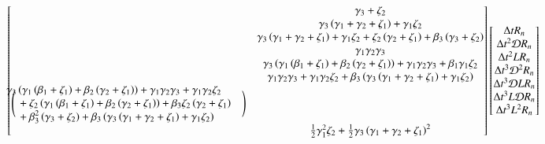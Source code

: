\documentclass[letterpaper,11pt]{amsart}
\begin{document}
\begin{align}
{\begin{bmatrix}
  &\gamma_{3} + \zeta_{2} \\
  &\gamma_{3} \left( \gamma_{1} + \gamma_{2} + \zeta_{1} \right)
  + \gamma_{1} \zeta_{2} \\
  &\gamma_{3} \left( \gamma_{1} + \gamma_{2} + \zeta_{1} \right)
  + \gamma_{1} \zeta_{2}
  + \zeta_{2} \left( \gamma_{2} + \zeta_{1} \right)
  + \beta_{3} \left( \gamma_{3} + \zeta_{2} \right) \\
  &\gamma_{1} \gamma_{2} \gamma_{3} \\
  &\gamma_{3} \left(
      \gamma_{1} \left(  \beta_{1} + \zeta_{1} \right)
      + \beta_{2} \left( \gamma_{2} + \zeta_{1} \right)
    \right)
  + \gamma_{1} \gamma_{2} \gamma_{3}
  + \beta_{1} \gamma_{1} \zeta_{2} \\
  &\gamma_{1} \gamma_{2} \gamma_{3}
  + \gamma_{1} \gamma_{2} \zeta_{2}
  + \beta_{3} \left(
      \gamma_{3} \left( \gamma_{1} + \gamma_{2} + \zeta_{1} \right)
    + \gamma_{1} \zeta_{2}
    \right) \\
%
\Bigg(\mspace{-18mu}
\begin{split}
  &\gamma_{3} \left(
      \gamma_{1} \left(  \beta_{1} + \zeta_{1} \right)
      + \beta_{2} \left( \gamma_{2} + \zeta_{1} \right)
    \right)
  + \gamma_{1} \gamma_{2} \gamma_{3}
  + \gamma_{1} \gamma_{2} \zeta_{2}
  \\
  &\quad+ \zeta_{2} \left(
        \gamma_{1} \left( \beta_{1} + \zeta_{1} \right)
      + \beta_{2} \left( \gamma_{2} + \zeta_{1} \right)
    \right)
  + \beta_{3} \zeta_{2} \left( \gamma_{2} + \zeta_{1} \right)
  \\
  &\quad+ \beta_{3}^{2} \left( \gamma_{3} + \zeta_{2} \right)
  + \beta_{3} \left(
      \gamma_{3} \left( \gamma_{1} + \gamma_{2} + \zeta_{1} \right)
    + \gamma_{1} \zeta_{2}
    \right)
\end{split}
\mspace{18mu}\Bigg)
  \\
%
  &\frac{1}{2}\gamma_{1}^{2}\zeta_{2}
  + \frac{1}{2}\gamma_{3}\left( \gamma_{1}+\gamma_{2}+\zeta_{1} \right)^{2}
\end{bmatrix}}
\begin{bmatrix}
  \Delta{}t R_{n} \\
  \Delta{}t^{2} \mathcal{D} R_{n} \\
  \Delta{}t^{2} L R_{n} \\
  \Delta{}t^{3} \mathcal{D}^{2} R_{n} \\
  \Delta{}t^{3} \mathcal{D} L R_{n} \\
  \Delta{}t^{3} L \mathcal{D} R_{n} \\
  \Delta{}t^{3} L^{2} R_{n} \\

\end{bmatrix}
\end{align}
\end{document}
